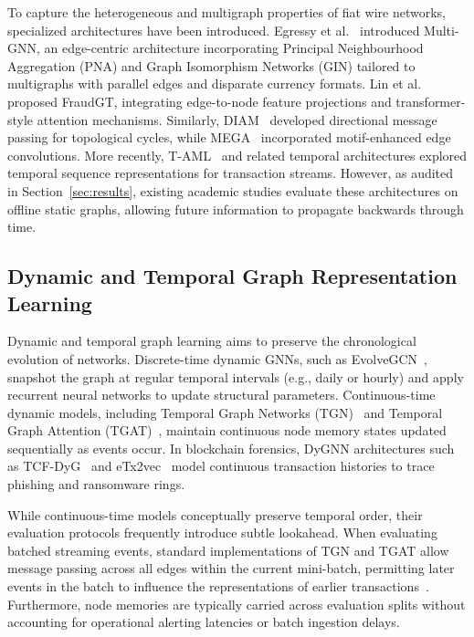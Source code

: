 \documentclass[pdflatex,sn-mathphys,Numbered]{sn-jnl}
\theoremstyle{thmstyleone}
\theoremstyle{thmstyletwo}
\theoremstyle{thmstylethree}
\begin{document}
To capture the heterogeneous and multigraph properties of fiat wire networks, specialized architectures have been introduced. Egressy et al.~\cite{egressy2024multigraph} introduced Multi-GNN, an edge-centric architecture incorporating Principal Neighbourhood Aggregation (PNA) and Graph Isomorphism Networks (GIN) tailored to multigraphs with parallel edges and disparate currency formats. Lin et al.~\cite{lin2024fraudgt} proposed FraudGT, integrating edge-to-node feature projections and transformer-style attention mechanisms. Similarly, DIAM~\cite{ding2024diam} developed directional message passing for topological cycles, while MEGA~\cite{bilgi2026mega} incorporated motif-enhanced edge convolutions. More recently, T-AML~\cite{altman2023ibmaml} and related temporal architectures explored temporal sequence representations for transaction streams. However, as audited in Section~\ref{sec:results}, existing academic studies evaluate these architectures on offline static graphs, allowing future information to propagate backwards through time.

\subsection{Dynamic and Temporal Graph Representation Learning}
Dynamic and temporal graph learning aims to preserve the chronological evolution of networks. Discrete-time dynamic GNNs, such as EvolveGCN~\cite{pareja2020evolvegcn}, snapshot the graph at regular temporal intervals (e.g., daily or hourly) and apply recurrent neural networks to update structural parameters. Continuous-time dynamic models, including Temporal Graph Networks (TGN)~\cite{rossi2020tgn} and Temporal Graph Attention (TGAT)~\cite{xu2020tgat}, maintain continuous node memory states updated sequentially as events occur. In blockchain forensics, DyGNN architectures such as TCF-DyG~\cite{li2026tcfdyg} and eTx2vec~\cite{lu2026etx2vec} model continuous transaction histories to trace phishing and ransomware rings.

While continuous-time models conceptually preserve temporal order, their evaluation protocols frequently introduce subtle lookahead. When evaluating batched streaming events, standard implementations of TGN and TGAT allow message passing across all edges within the current mini-batch, permitting later events in the batch to influence the representations of earlier transactions~\cite{daniluk2023global}. Furthermore, node memories are typically carried across evaluation splits without accounting for operational alerting latencies or batch ingestion delays.
\end{document}
